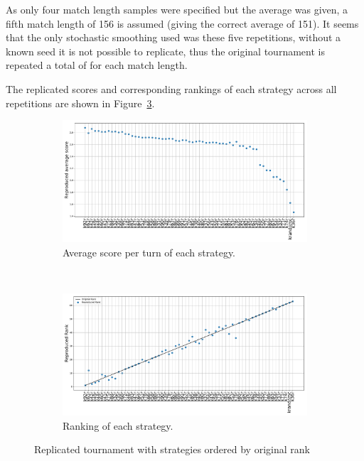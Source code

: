 \documentclass{article}
\begin{document}
As only four match length samples were specified but the average was given, a
fifth match length of 156 is assumed (giving the correct average of 151).  It
seems that the only stochastic smoothing used was these five repetitions,
without a known seed it is not possible to replicate, thus the original
tournament is repeated a total of
for each match length.

The replicated scores and corresponding rankings of each strategy across all
repetitions are shown in
Figure~\ref{fig:replicated_tournament}.

\begin{figure}[!hbtp]
    \centering
    \begin{subfigure}[t]{.5\textwidth}
        \includegraphics[width=.95\textwidth]{assets/original_tournament_scores.pdf}
        \caption{Average score per turn of each strategy.}
        \label{fig:original_tournament_scores}
    \end{subfigure}%
    ~
    \begin{subfigure}[t]{0.5\textwidth}
        \includegraphics[width=.95\textwidth]{assets/original_tournament_rankings.pdf}
        \caption{Ranking of each strategy.}
        \label{fig:original_tournament_ranks}
    \end{subfigure}
    \caption{Replicated tournament with strategies ordered by original rank}
    \label{fig:replicated_tournament}
\end{figure}
\end{document}
